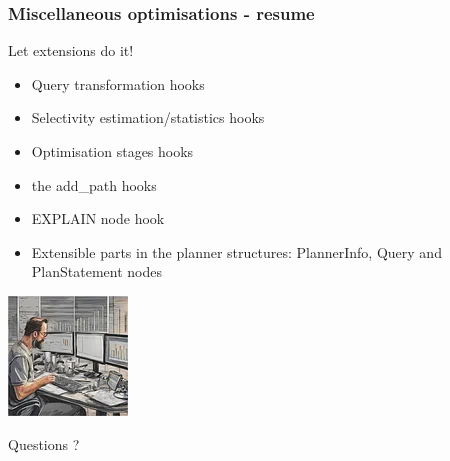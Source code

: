 \documentclass{beamer}
\begin{document}
\begin{frame}[fragile]\frametitle{Miscellaneous optimisations - resume}
Let extensions do it!
\begin{itemize}
  \item Query transformation hooks
  \item Selectivity estimation/statistics hooks
  \item Optimisation stages hooks
  \item the add\_path hooks
  \item EXPLAIN node hook
  \item Extensible parts in the planner structures: PlannerInfo, Query and PlanStatement nodes
\end{itemize}
\end{frame}


\begin{frame}
\begin{center}
\begin{center}
\includegraphics[scale=0.5]{pics/project_logo}
\end{center}
\huge{Questions ?}
\end{center}
\end{frame}

\end{document}
